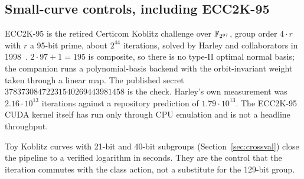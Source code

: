 \subsection{Small-curve controls, including ECC2K-95}

ECC2K-95 is the retired Certicom Koblitz challenge over
$\mathbb{F}_{2^{97}}$, group order $4\cdot r$ with $r$ a 95-bit prime, about
$2^{44}$ iterations, solved by Harley and collaborators in
1998~\cite{harley1998}. $2\cdot 97+1=195$ is composite, so there is
no type-II optimal normal basis; the companion runs a
polynomial-basis backend with the orbit-invariant weight taken
through a linear map. The published secret
$37837308472231540269443981458$ is the check. Harley's own
measurement was $2.16\cdot 10^{13}$ iterations against a repository
prediction of $1.79\cdot 10^{13}$. The ECC2K-95 CUDA kernel itself
has run only through CPU emulation and is not a headline
throughput.

Toy Koblitz curves with 21-bit and 40-bit subgroups (Section~\ref{sec:crossval})
close the pipeline to a verified logarithm in seconds. They are the
control that the iteration commutes with the class action, not a
substitute for the 129-bit group.
